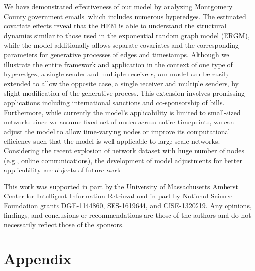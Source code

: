 \documentclass[ba]{imsart}
\numberwithin{equation}{section}
\theoremstyle{plain}
\begin{document}
We have demonstrated effectiveness of our model by analyzing Montgomery County government emails, which includes numerous hyperedges. The estimated covariate effects reveal that the HEM is able to understand the structural dynamics similar to those used in the exponential random graph model (ERGM), while the model additionally allows separate covariates and the corresponding parameters for generative processes of edges and timestamps. Although we illustrate the entire framework and application in the context
of one type of hyperedges, a single sender and multiple receivers, our model can be easily extended to allow the opposite case, a single receiver and multiple senders, by slight modification of the generative process. This extension involves promissing applications including international sanctions and co-sponsorship of bills. Furthermore, while currently the model's applicability is limited to small-sized networks since we assume fixed set of nodes across entire timepoints, we can adjust the model to allow time-varying nodes or improve its computational efficiency such that the model is well applicable to large-scale networks. Considering the recent explosion of network dataset with huge number of nodes (e.g., online comnunications), the development of model adjustments for better applicability are objects of future work.

\begin{acknowledgement}
	This work was supported in part by the University of Massachusetts Amherst Center for Intelligent Information Retrieval and in part by National Science Foundation grants DGE-1144860, SES-1619644, and CISE-1320219. Any opinions, findings, and conclusions or recommendations are those of the authors and do not necessarily reflect those of the
	sponsors.
\end{acknowledgement}

\section*{Appendix}
\end{document}
